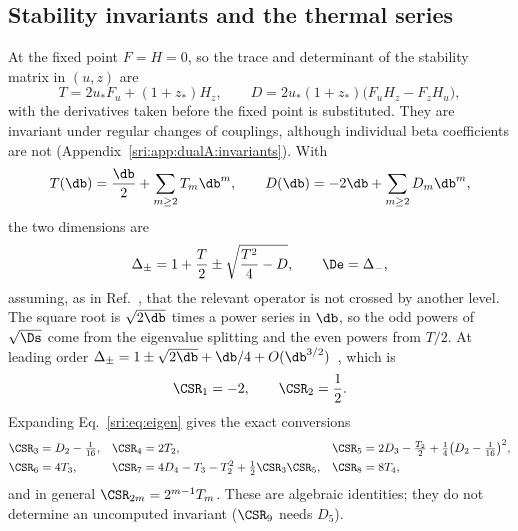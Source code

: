 \subsection{Stability invariants and the thermal series}\label{sri:sec:invariants}
At the fixed point $F=H=0$, so the trace and determinant of the stability matrix in $(u,z)$ are
\begin{equation}
 T=2u_*F_u+(1+z_*)H_z,\qquad D=2u_*(1+z_*)\bigl(F_uH_z-F_zH_u\bigr),
\end{equation}
with the derivatives taken before the fixed point is substituted. They are invariant under regular changes of
couplings, although individual beta coefficients are not (Appendix~\ref{sri:app:dualA:invariants}). With
\begin{equation}
 T(\db)=\frac{\db}{2}+\sum_{m\ge2}T_m\db^m,\qquad D(\db)=-2\db+\sum_{m\ge2}D_m\db^m,
\end{equation}
the two dimensions are
\begin{equation}
 \Delta_\pm=1+\frac T2\pm\sqrt{\frac{T^2}{4}-D},\qquad \De=\Delta_-,
 \label{sri:eq:eigen}
\end{equation}
assuming, as in Ref.~\cite{sri:Paper}, that the relevant operator is not crossed by another level. The square root is
$\sqrt{2\db}$ times a power series in $\db$, so the odd powers of $\sqrt{\Ds}$ come from the eigenvalue splitting and
the even powers from $T/2$. At leading order $\Delta_\pm=1\pm\sqrt{2\db}+\db/4+O(\db^{3/2})$~\cite{sri:Benedetti:2025nzp},
which is
\begin{equation}
 \CSR_1=-2,\qquad \CSR_2=\frac12.
\end{equation}
Expanding Eq.~\eqref{sri:eq:eigen} gives the exact conversions
\begin{equation}
\begin{aligned}
 \CSR_3&=D_2-\tfrac1{16}, & \CSR_4&=2T_2, & \CSR_5&=2D_3-\tfrac{T_2}{2}+\tfrac14\bigl(D_2-\tfrac1{16}\bigr)^2,\\
 \CSR_6&=4T_3, & \CSR_7&=4D_4-T_3-T_2^2+\tfrac12\CSR_3\CSR_5, & \CSR_8&=8T_4,
\end{aligned}
\label{sri:eq:conv}
\end{equation}
and in general $\CSR_{2m}=2^{m-1}T_m$. These are algebraic identities; they do not determine an uncomputed invariant
($\CSR_9$ needs $D_5$).

